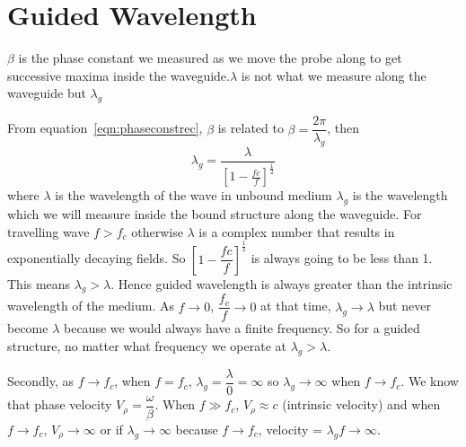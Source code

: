 \section{Guided Wavelength}
$\beta$ is the phase constant we measured as we move the probe along to get successive maxima inside the waveguide.$\lambda$ is not what we measure along the waveguide but $\lambda_g$

From equation~\ref{eqn:phaseconstrec}, $\beta$ is related to  $\beta = \dfrac{2\pi}{\lambda_g}$, then 
\begin{dmath}
\lambda_g = \frac{\lambda}{\left[1-{\frac{fc}{f}}\right]^{\frac{1}{2}}}
\label{eqn:lambdag}
\end{dmath}
where $\lambda$ is the wavelength of the wave in unbound medium $\lambda_g$ is the wavelength which we will measure inside the bound structure along the waveguide. For travelling wave $f>f_c$ otherwise $\lambda$ is a complex number that results in exponentially decaying fields. So $\left[1-{\dfrac{fc}{f}}\right]^{\frac{1}{2}}$ is always going to be less than 1. This means $\lambda_g>\lambda$. Hence guided wavelength is always greater than the intrinsic wavelength of the medium. As $f\longrightarrow0$, $\dfrac{f_c}{f}\longrightarrow0$ at that time, $\lambda_g\longrightarrow\lambda$ but never become $\lambda$ because we would always have a finite frequency. So for a guided structure, no matter what frequency we operate at $\lambda_g>\lambda$.

Secondly, as $f\longrightarrow f_c$, when $f=f_c$, $\lambda_g = \dfrac{\lambda}{0} = \infty$ so $\lambda_g\longrightarrow\infty$ when $f\longrightarrow f_c$. We know that phase velocity $V_\rho = \dfrac{\omega}{\beta}$. When $f\gg f_c$, $V_\rho\approx c$ (intrinsic velocity) and when $f\longrightarrow f_c$, $V_\rho\longrightarrow\infty$ or if $\lambda_g\longrightarrow\infty$ because $f\longrightarrow f_c$, velocity = $\lambda_gf\longrightarrow\infty$.


